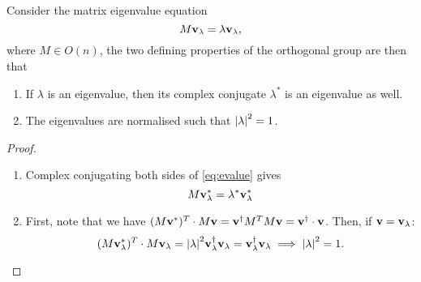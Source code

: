 
\begin{claim}
  Consider the matrix eigenvalue equation
  \begin{equation} \label{eq:evalue}
    M \vb{v}_\lambda = \lambda \vb{v}_\lambda,
  \end{equation}
  where $M \in O(n)$, the two defining properties of the orthogonal group are then that
  \begin{enumerate}
    \item If $\lambda$ is an eigenvalue, then its complex conjugate $\lambda^*$ is an eigenvalue as well.
    \item The eigenvalues are normalised such that $\abs{\lambda}^2 = 1$.
  \end{enumerate}
\end{claim}
\begin{proof}
  \begin{enumerate}
    \item Complex conjugating both sides of \eqref{eq:evalue} gives
      \begin{equation}
        M \vb{v}_\lambda^* = \lambda^* \vb{v}_\lambda^*
      \end{equation}
    \item First, note that we have \((M \vb{v}^*)^T \cdot M \vb{v} = \vb{v}^{\dagger} M^T M \vb{v} = \vb{v}^{\dagger} \cdot \vb{v}\).
      Then, if $\vb{v} = \vb{v}_\lambda$:
      \begin{equation}
	(M \vb{v}_\lambda^*)^T \cdot M \vb{v}_\lambda = \abs{\lambda}^2 \vb{v}^{\dagger}_\lambda \vb{v}_\lambda = \vb{v}^{\dagger}_\lambda \vb{v}_\lambda \implies \abs{\lambda}^2 = 1.
      \end{equation}
  \end{enumerate}
\end{proof}


